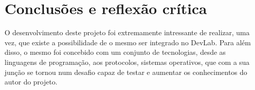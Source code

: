 \chapter{Conclusões e reflexão crítica}
\label{chap:conclusions}


O desenvolvimento deste projeto foi extremamente intressante de realizar, uma vez, que
existe a possibilidade de o mesmo ser integrado no DevLab. Para além disso, o mesmo foi 
concebido com um conjunto de tecnologias, desde as linguagens de programação, aos protocolos, 
sistemas operativos, que com a sua junção se tornou num desafio capaz de testar e aumentar
os conhecimentos do autor do projeto.




